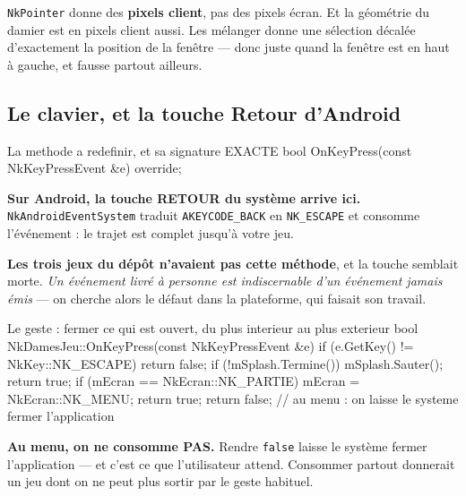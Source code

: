\begin{nkpiege}
\texttt{NkPointer} donne des \textbf{pixels client}, pas des pixels écran. Et la
géométrie du damier est en pixels client aussi. Les mélanger donne une
sélection décalée d'exactement la position de la fenêtre --- donc juste quand la
fenêtre est en haut à gauche, et fausse partout ailleurs.
\end{nkpiege}

\subsection{Le clavier, et la touche Retour d'Android}

\begin{nkcode}{La methode a redefinir, et sa signature EXACTE}
bool OnKeyPress(const NkKeyPressEvent &e) override;
\end{nkcode}

\begin{nkretenir}
\textbf{Sur Android, la touche RETOUR du système arrive ici.}
\texttt{NkAndroidEventSystem} traduit \texttt{AKEYCODE\_BACK} en
\texttt{NK\_ESCAPE} et consomme l'événement : le trajet est complet jusqu'à
votre jeu.

\textbf{Les trois jeux du dépôt n'avaient pas cette méthode}, et la touche
semblait morte. \emph{Un événement livré à personne est indiscernable d'un
événement jamais émis} --- on cherche alors le défaut dans la plateforme, qui
faisait son travail.
\end{nkretenir}

\begin{nkcode}{Le geste : fermer ce qui est ouvert, du plus interieur au plus exterieur}
bool NkDamesJeu::OnKeyPress(const NkKeyPressEvent &e) {
    if (e.GetKey() != NkKey::NK_ESCAPE) { return false; }
    if (!mSplash.Termine())            { mSplash.Sauter();       return true; }
    if (mEcran == NkEcran::NK_PARTIE)  { mEcran = NkEcran::NK_MENU; return true; }
    return false;   // au menu : on laisse le systeme fermer l'application
}
\end{nkcode}

\begin{nkretenir}
\textbf{Au menu, on ne consomme PAS.} Rendre \texttt{false} laisse le système
fermer l'application --- et c'est ce que l'utilisateur attend. Consommer partout
donnerait un jeu dont on ne peut plus sortir par le geste habituel.
\end{nkretenir}

